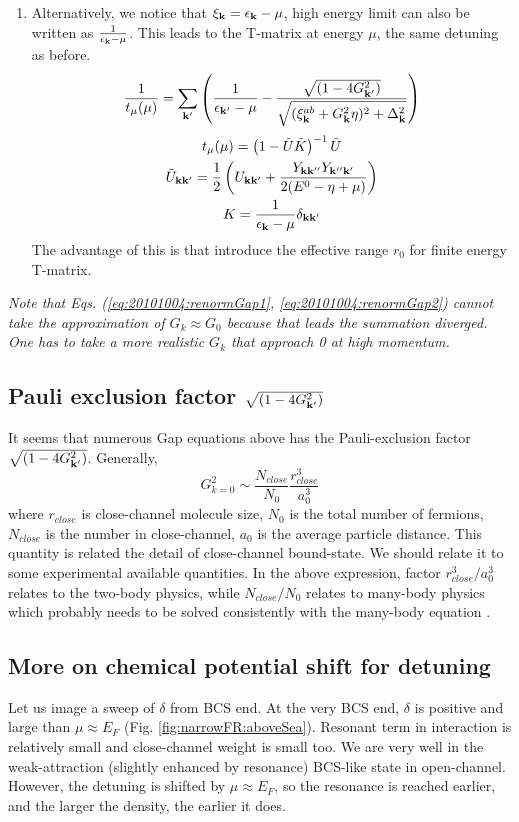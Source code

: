 \begin{enumerate}
\item  Alternatively, we notice that $\xi_{\mathbf{k}}=\epsilon_{\mathbf{k}}-\mu$, high energy limit can also be written as 
$\frac{1}{\epsilon_{\mathbf{k}}-\mu}$.  This leads to the T-matrix at energy $\mu$, the same detuning as before.  
\begin{equation}\label{eq:20101004:renormGap2}
\frac{1}{{t_{\mu}}(\mu)}=\sum_{\mathbf{k}'}
\left(\frac{1}{\epsilon_{\mathbf{k}'}-\mu}-\frac{\sqrt{(1-4G_{\mathbf{k}'}^{2})}}{\sqrt{{(\xi^{ab}_{\mathbf{k}}+  G_{\mathbf{k}}^2\eta)^{2}+\Delta_{\mathbf{k}}^{2}}}}\right)
\end{equation} 
\begin{gather}
{t_{\mu}}(\mu)=\left(1-\tilde{U}\tilde{ K}\right)^{-1}\tilde{U}\label{eq:20101004:t02}\\
\tilde{U}_{\mathbf{k}\mathbf{k}'}=\frac{1}{2} \left(U_{\mathbf{k}\mathbf{k}'}+\frac{Y_{\mathbf{k}\mathbf{k}''}Y_{\mathbf{k}''\mathbf{k}'}}{2(E^{0}-\eta+\mu)}\right)\label{eq:20101004:tu2}\\
{K}=\frac{1}{\epsilon_{\mathbf{k}}-\mu}\delta_{\mathbf{k}\mathbf{k}'}\label{eq:20101004:tk2}
\end{gather}
The advantage of this is that introduce the effective range $r_{0}$ for finite energy T-matrix. 
\end{enumerate}
\emph{Note that Eqs. (\ref{eq:20101004:renormGap1}, \ref{eq:20101004:renormGap2}) cannot take the approximation of $G_{k}\approx{G_{0}}$ because that leads the summation diverged.  One has to take a more realistic $G_{k}$ that approach 0 at high momentum.  }
\subsection{Pauli exclusion factor  $\sqrt{(1-4G_{\mathbf{k}'}^{2})}$ }
It seems that numerous Gap equations above has the Pauli-exclusion factor $\sqrt{(1-4G_{\mathbf{k}'}^{2})}$.  Generally, 
\begin{equation}
G_{k=0}^{2}\sim{\frac{N_{close}}{N_{0}}\frac{r_{close}^{3}}{a_{0}^{3}}}
\end{equation}
where $r_{close}$ is close-channel molecule size, $N_{0}$ is the total number of fermions, $N_{close}$ is the number in close-channel, $a_{0}$ is the average particle distance.  This quantity is related the detail of close-channel bound-state.  We should relate it to some experimental available quantities.  In the above expression, factor $r_{close}^{3}/a_{0}^{3}$ relates to the two-body physics, while $N_{close}/N_{0}$ relates to many-body physics which probably needs to be solved consistently with the many-body equation .  

\subsection{More on chemical potential shift for detuning}
Let us image a sweep of $\delta$ from BCS end.  At the very BCS end, $\delta$ is positive and large than $\mu\approx{}E_{F}$ (Fig. \ref{fig:narrowFR:aboveSea}). Resonant term in interaction is relatively small and close-channel weight is small too.  We are very well in the  weak-attraction (slightly enhanced by resonance) BCS-like state in open-channel.  However, the detuning is shifted by $\mu\approx{}E_{F}$, so the resonance is reached earlier, and the larger the density, the earlier it does.  

